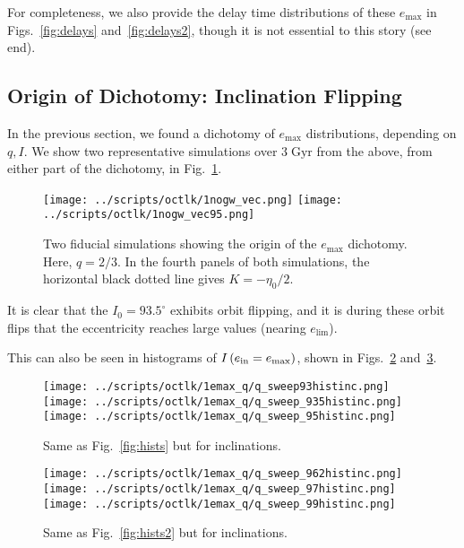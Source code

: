 \documentclass[11pt,
        usenames, %
        dvipsnames %
    ]{article}
\newcommand*{\p}[1]{\left(#1\right)}
\begin{document}
For completeness, we also provide the delay time distributions of these
$e_{\max}$ in Figs.~\ref{fig:delays} and~\ref{fig:delays2}, though it is not
essential to this story (see end).

\subsection{Origin of Dichotomy: Inclination Flipping}

In the previous section, we found a dichotomy of $e_{\max}$ distributions,
depending on $q, I$. We show two representative simulations over
$3\;\mathrm{Gyr}$ from the above, from either part of the dichotomy, in
Fig.~\ref{fig:fiducial}.
\begin{figure}
    \centering
    \texttt{[image: ../scripts/octlk/1nogw\_vec.png]}
    \texttt{[image: ../scripts/octlk/1nogw\_vec95.png]}
    \caption{Two fiducial simulations showing the origin of the $e_{\max}$
    dichotomy. Here, $q = 2/3$. In the fourth panels of both simulations, the
    horizontal black dotted line gives $K = -\eta_0/2$.}\label{fig:fiducial}
\end{figure}

It is clear that the $I_0 = 93.5^\circ$ exhibits orbit flipping, and it is
during these orbit flips that the eccentricity reaches large values (nearing
$e_{\lim}$).

This can also be seen in histograms of $I\p{e_{\rm in} = e_{\max}}$, shown in
Figs.~\ref{fig:histinc} and~\ref{fig:histinc2}.
\begin{figure}
    \centering
    \texttt{[image: ../scripts/octlk/1emax\_q/q\_sweep93histinc.png]}
    \texttt{[image: ../scripts/octlk/1emax\_q/q\_sweep\_935histinc.png]}
    \texttt{[image: ../scripts/octlk/1emax\_q/q\_sweep\_95histinc.png]}
    \caption{Same as Fig.~\ref{fig:hists} but for inclinations.}\label{fig:histinc}
\end{figure}
\begin{figure}
    \centering
    \texttt{[image: ../scripts/octlk/1emax\_q/q\_sweep\_962histinc.png]}
    \texttt{[image: ../scripts/octlk/1emax\_q/q\_sweep\_97histinc.png]}
    \texttt{[image: ../scripts/octlk/1emax\_q/q\_sweep\_99histinc.png]}
    \caption{Same as Fig.~\ref{fig:hists2} but for inclinations.}\label{fig:histinc2}
\end{figure}
\end{document}
